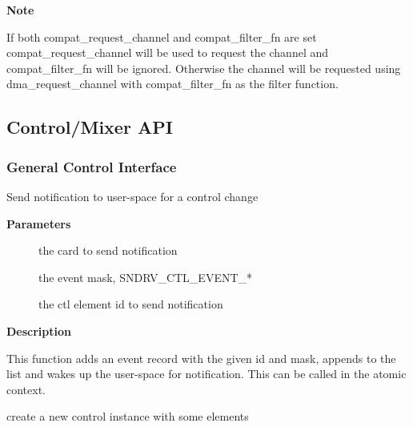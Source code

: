 \documentclass[a4paper,8pt,english]{sphinxmanual}
\begin{document}
\textbf{Note}

If both compat\_request\_channel and compat\_filter\_fn are set
compat\_request\_channel will be used to request the channel and
compat\_filter\_fn will be ignored. Otherwise the channel will be requested
using dma\_request\_channel with compat\_filter\_fn as the filter function.


\subsection{Control/Mixer API}
\label{sound/kernel-api/alsa-driver-api:control-mixer-api}

\subsubsection{General Control Interface}
\label{sound/kernel-api/alsa-driver-api:general-control-interface}

\begin{fulllineitems}
\label{sound/kernel-api/alsa-driver-api:c.snd_ctl_notify}
Send notification to user-space for a control change

\end{fulllineitems}


\textbf{Parameters}
\begin{description}
\item[{}] \leavevmode
the card to send notification

\item[{}] \leavevmode
the event mask, SNDRV\_CTL\_EVENT\_*

\item[{}] \leavevmode
the ctl element id to send notification

\end{description}

\textbf{Description}

This function adds an event record with the given id and mask, appends
to the list and wakes up the user-space for notification.  This can be
called in the atomic context.

\begin{fulllineitems}
\label{sound/kernel-api/alsa-driver-api:c.snd_ctl_new}
create a new control instance with some elements

\end{fulllineitems}
\end{document}
